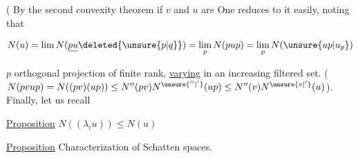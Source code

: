 (  By the second convexity theorem if $v$ and $u$ are    One reduces to it easily, noting that 

\[
N(u)=\lim N(\underline{pu}\deleted{\unsure{p|q}})=\lim_p N(pup)=\lim_p N(\unsure{up|u_p})
\]

$p$ orthogonal projection of finite rank, \uline{varying} in an increasing filtered set. ( $N(pvup)=N((pv)(up))\leq N''(pv)N^{\unsure{''|'}}(up)\leq N''(v)N^{\unsure{\circ|'}}(u)$). Finally, let us recall

\uline{Proposition} $N((\lambda_i u))\leq N(u)$

\uline{Proposition} Characterization of Schatten spaces.

